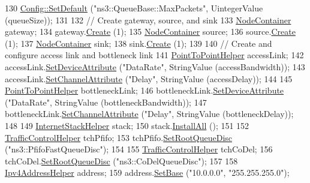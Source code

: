 \begin{DoxyCode}
130   \hyperlink{group__config_ga2e7882df849d8ba4aaad31c934c40c06}{Config::SetDefault} (\textcolor{stringliteral}{"ns3::QueueBase::MaxPackets"}, UintegerValue (queueSize));
131 
132   \textcolor{comment}{// Create gateway, source, and sink}
133   \hyperlink{classns3_1_1NodeContainer}{NodeContainer} gateway;
134   gateway.\hyperlink{classns3_1_1NodeContainer_a787f059e2813e8b951cc6914d11dfe69}{Create} (1);
135   \hyperlink{classns3_1_1NodeContainer}{NodeContainer} source;
136   source.\hyperlink{classns3_1_1NodeContainer_a787f059e2813e8b951cc6914d11dfe69}{Create} (1);
137   \hyperlink{classns3_1_1NodeContainer}{NodeContainer} sink;
138   sink.\hyperlink{classns3_1_1NodeContainer_a787f059e2813e8b951cc6914d11dfe69}{Create} (1);
139 
140   \textcolor{comment}{// Create and configure access link and bottleneck link}
141   \hyperlink{classns3_1_1PointToPointHelper}{PointToPointHelper} accessLink;
142   accessLink.\hyperlink{classns3_1_1PointToPointHelper_a4577f5ab8c387e5528af2e0fbab1152e}{SetDeviceAttribute} (\textcolor{stringliteral}{"DataRate"}, StringValue (accessBandwidth));
143   accessLink.\hyperlink{classns3_1_1PointToPointHelper_a6b5317fd17fb61e5a53f8d66a90b63b9}{SetChannelAttribute} (\textcolor{stringliteral}{"Delay"}, StringValue (accessDelay));
144 
145   \hyperlink{classns3_1_1PointToPointHelper}{PointToPointHelper} bottleneckLink;
146   bottleneckLink.\hyperlink{classns3_1_1PointToPointHelper_a4577f5ab8c387e5528af2e0fbab1152e}{SetDeviceAttribute} (\textcolor{stringliteral}{"DataRate"}, StringValue (bottleneckBandwidth));
147   bottleneckLink.\hyperlink{classns3_1_1PointToPointHelper_a6b5317fd17fb61e5a53f8d66a90b63b9}{SetChannelAttribute} (\textcolor{stringliteral}{"Delay"}, StringValue (bottleneckDelay));
148 
149   \hyperlink{classns3_1_1InternetStackHelper}{InternetStackHelper} stack;
150   stack.\hyperlink{classns3_1_1InternetStackHelper_a6cfa73782fd4071c4cfbd73ebf1bbb44}{InstallAll} ();
151 
152   \hyperlink{classns3_1_1TrafficControlHelper}{TrafficControlHelper} tchPfifo;
153   tchPfifo.\hyperlink{classns3_1_1TrafficControlHelper_a8588aac7a08e4dc4e7bb10fa7b9e25c8}{SetRootQueueDisc} (\textcolor{stringliteral}{"ns3::PfifoFastQueueDisc"});
154 
155   \hyperlink{classns3_1_1TrafficControlHelper}{TrafficControlHelper} tchCoDel;
156   tchCoDel.\hyperlink{classns3_1_1TrafficControlHelper_a8588aac7a08e4dc4e7bb10fa7b9e25c8}{SetRootQueueDisc} (\textcolor{stringliteral}{"ns3::CoDelQueueDisc"});
157 
158   \hyperlink{classns3_1_1Ipv4AddressHelper}{Ipv4AddressHelper} address;
159   address.\hyperlink{classns3_1_1Ipv4AddressHelper_acf7b16dd25bac67e00f5e25f90a9a035}{SetBase} (\textcolor{stringliteral}{"10.0.0.0"}, \textcolor{stringliteral}{"255.255.255.0"});

\end{DoxyCode}
